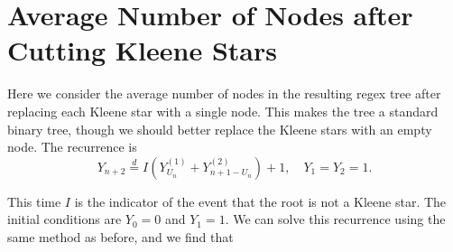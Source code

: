 \chapter{Average Number of Nodes after Cutting Kleene Stars}

Here we consider the average number of nodes in the resulting regex tree after replacing each Kleene star with a single node. This makes the tree a standard binary tree, though we should better replace the Kleene stars with an empty node. The recurrence is
\begin{equation}
  Y_{n+2} \stackrel{d}{=} I\left(Y_{U_n}^{(1)} + Y_{n+1-U_n}^{(2)}\right) + 1, \quad Y_1 = Y_2 = 1.
\end{equation}

This time $I$ is the indicator of the event that the root is not a Kleene star. The initial conditions are $Y_0 = 0$ and $Y_1 = 1$. We can solve this recurrence using the same method as before, and we find that